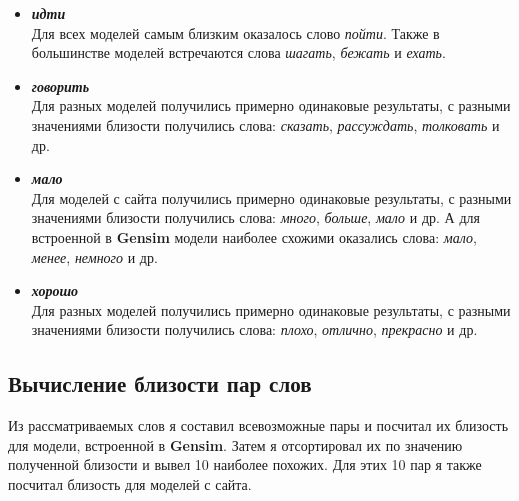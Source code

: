 \documentclass[oneside,final,12pt]{article}
\begin{document}
\begin{itemize}
	\item {\textbf{\textit{идти}}\\
		Для всех моделей самым близким оказалось слово \textit{пойти}. Также в большинстве моделей встречаются слова \textit{шагать},  \textit{бежать} и \textit{ехать}. }
	\item {\textbf{\textit{говорить}}\\
	Для разных моделей получились примерно одинаковые результаты, с разными значениями близости получились слова: \textit{сказать}, \textit{рассуждать}, \textit{толковать} и др. }
	\item {\textbf{\textit{мало}}\\
		Для моделей с сайта получились примерно одинаковые результаты, с разными значениями близости получились слова: \textit{много}, \textit{больше}, \textit{мало} и др. А для встроенной в \textbf{Gensim} модели наиболее схожими оказались слова: \textit{мало}, \textit{менее}, \textit{немного} и др. }
	\item {\textbf{\textit{хорошо}}\\
		Для разных моделей получились примерно одинаковые результаты, с разными значениями близости получились слова: \textit{плохо}, \textit{отлично}, \textit{прекрасно} и др. }
\end{itemize}

\subsection{Вычисление близости пар слов}

Из рассматриваемых слов я составил всевозможные пары и посчитал их близость для модели, встроенной в \textbf{Gensim}. Затем я отсортировал их по значению полученной близости и вывел 10 наиболее похожих. Для этих 10 пар я также посчитал близость для моделей с сайта.
\clearpage
\end{document}
